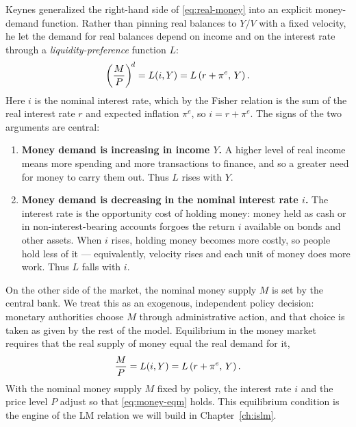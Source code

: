 Keynes generalized the right-hand side of \eqref{eq:real-money} into an explicit money-demand function. Rather than pinning real balances to $Y/V$ with a fixed velocity, he let the demand for real balances depend on income and on the interest rate through a \emph{liquidity-preference} function $L$:
\begin{equation}
\left(\frac{M}{P}\right)^{\!d} = L(i, Y) = L\left(r + \pi^{e},\, Y\right).
\label{eq:liq-pref}
\end{equation}
Here $i$ is the nominal interest rate, which by the Fisher relation is the sum of the real interest rate $r$ and expected inflation $\pi^{e}$, so $i = r + \pi^{e}$. The signs of the two arguments are central:
\begin{enumerate}
    \item \textbf{Money demand is increasing in income $Y$.} A higher level of real income means more spending and more transactions to finance, and so a greater need for money to carry them out. Thus $L$ rises with $Y$.
    \item \textbf{Money demand is decreasing in the nominal interest rate $i$.} The interest rate is the opportunity cost of holding money: money held as cash or in non-interest-bearing accounts forgoes the return $i$ available on bonds and other assets. When $i$ rises, holding money becomes more costly, so people hold less of it --- equivalently, velocity rises and each unit of money does more work. Thus $L$ falls with $i$.
\end{enumerate}


On the other side of the market, the nominal money supply $M$ is set by the central bank. We treat this as an exogenous, independent policy decision: monetary authorities choose $M$ through administrative action, and that choice is taken as given by the rest of the model. Equilibrium in the money market requires that the real supply of money equal the real demand for it,
\begin{equation}
\frac{M}{P} = L(i, Y) = L\left(r + \pi^{e},\, Y\right).
\label{eq:money-eqm}
\end{equation}
With the nominal money supply $M$ fixed by policy, the interest rate $i$ and the price level $P$ adjust so that \eqref{eq:money-eqm} holds. This equilibrium condition is the engine of the LM relation we will build in Chapter~\ref{ch:islm}.

